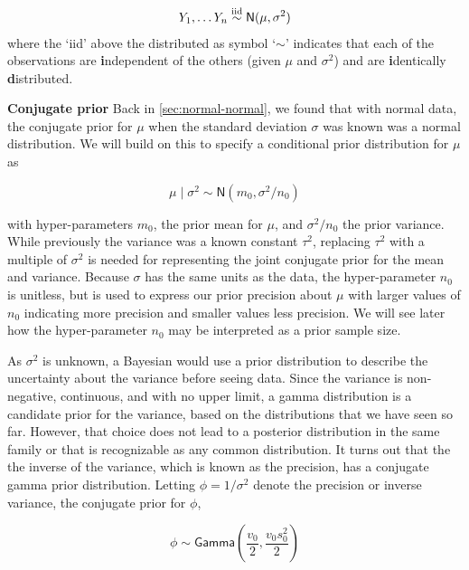 \documentclass[]{book}
\theoremstyle{definition}
\theoremstyle{definition}
\theoremstyle{remark}
\begin{document}
\[\begin{aligned}
Y_1, \ldots Y_n  \mathrel{\mathop{\sim}\limits^{\rm iid}}
\textsf{N}(\mu, \sigma^2) 
\end{aligned}\] where the `iid' above the distributed as symbol
`\(\sim\)' indicates that each of the observations are
\textbf{i}ndependent of the others (given \(\mu\) and \(\sigma^2\)) and
are \textbf{i}dentically \textbf{d}istributed.

\textbf{Conjugate prior} Back in \ref{sec:normal-normal}, we found that
with normal data, the conjugate prior for \(\mu\) when the standard
deviation \(\sigma\) was known was a normal distribution. We will build
on this to specify a conditional prior distribution for \(\mu\) as

\begin{equation}
\mu \mid \sigma^2   \sim  \textsf{N}(m_0, \sigma^2/n_0)
\label{eq:04-conjugate-normal}
\end{equation}

with hyper-parameters \(m_0\), the prior mean for \(\mu\), and
\(\sigma^2/n_0\) the prior variance. While previously the variance was a
known constant \(\tau^2\), replacing \(\tau^2\) with a multiple of
\(\sigma^2\) is needed for representing the joint conjugate prior for
the mean and variance. Because \(\sigma\) has the same units as the
data, the hyper-parameter \(n_0\) is unitless, but is used to express
our prior precision about \(\mu\) with larger values of \(n_0\)
indicating more precision and smaller values less precision. We will see
later how the hyper-parameter \(n_0\) may be interpreted as a prior
sample size.

As \(\sigma^2\) is unknown, a Bayesian would use a prior distribution to
describe the uncertainty about the variance before seeing data. Since
the variance is non-negative, continuous, and with no upper limit, a
gamma distribution is a candidate prior for the variance, based on the
distributions that we have seen so far. However, that choice does not
lead to a posterior distribution in the same family or that is
recognizable as any common distribution. It turns out that the the
inverse of the variance, which is known as the precision, has a
conjugate gamma prior distribution. Letting \(\phi = 1/\sigma^2\) denote
the precision or inverse variance, the conjugate prior for \(\phi\),

\begin{equation}
\phi \sim \textsf{Gamma}\left(\frac{v_0}{2}, \frac{v_0 s^2_0}{2} \right)
\label{eq:04-conjugate-gamma}
\end{equation}
\end{document}
